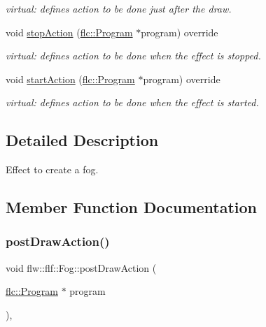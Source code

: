 \begin{DoxyCompactItemize}
\begin{DoxyCompactList}\small\item\em virtual\+: defines action to be done just after the draw. \end{DoxyCompactList}\item 
void \hyperlink{classflw_1_1flf_1_1Fog_ab1b33ed568e679c51f24937db7ffd45c}{stop\+Action} (\hyperlink{classflw_1_1flc_1_1Program}{flc\+::\+Program} $\ast$program) override
\begin{DoxyCompactList}\small\item\em virtual\+: defines action to be done when the effect is stopped. \end{DoxyCompactList}\item 
void \hyperlink{classflw_1_1flf_1_1Fog_a12acc2ae25d54721648265aa863c8b1e}{start\+Action} (\hyperlink{classflw_1_1flc_1_1Program}{flc\+::\+Program} $\ast$program) override
\begin{DoxyCompactList}\small\item\em virtual\+: defines action to be done when the effect is started. \end{DoxyCompactList}\end{DoxyCompactItemize}


\subsection{Detailed Description}
Effect to create a fog. 

\subsection{Member Function Documentation}
\mbox{\label{classflw_1_1flf_1_1Fog_a23da383300538478081e23277bcca4fa}} 
\subsubsection{\texorpdfstring{post\+Draw\+Action()}{postDrawAction()}}
{\footnotesize\ttfamily void flw\+::flf\+::\+Fog\+::post\+Draw\+Action (\begin{DoxyParamCaption}\item[{\hyperlink{classflw_1_1flc_1_1Program}{flc\+::\+Program} $\ast$}]{program }\end{DoxyParamCaption})\hspace{0.3cm}{\ttfamily [override]}, {\ttfamily [virtual]}}



